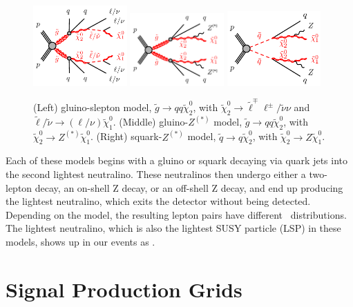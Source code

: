 \begin{figure}[htbp]
    \centering
    \includegraphics[width=0.32\textwidth]{Images/SUSY/gogo-qqqqllllN1N1-N2.pdf}
    \includegraphics[width=0.32\textwidth]{Images/SUSY/gogo-qqqqZZN1N1.pdf}
    \includegraphics[width=0.32\textwidth]{Images/SUSY/sqsq-qqZZN1N1.pdf}
    \caption{(Left) gluino-slepton model, $\tilde{g}\to qq \tilde{\chi}_2^0$, with $\tilde{\chi}_{2}^{0} \to \tilde{\ell}^{\mp}\ell^{\pm} / \tilde{\nu}\nu$ and $\tilde{\ell}/\tilde{\nu} \to (\ell/\nu)\tilde{\chi}_{1}^{0}$. (Middle) gluino-$Z^{(*)}$ model, $\tilde{g}\to qq \tilde{\chi}_2^0$, with $\tilde{\chi}_2^0\rightarrow Z^{(*)} \tilde{\chi}_1^0$. (Right) squark-$Z^{(*)}$ model, $\tilde{q}\to q \tilde{\chi}_2^0$, with $\tilde{\chi}_2^0\rightarrow Z \tilde{\chi}_1^0$.}
    \label{fig:SUSY_models}
\end{figure}

Each of these models begins with a gluino or squark decaying via quark jets into the second lightest neutralino. These neutralinos then undergo either a two-lepton decay, an on-shell Z decay, or an off-shell Z decay, and end up producing the lightest neutralino, which exits the detector without being detected. Depending on the model, the resulting lepton pairs have different \mll\ distributions. The lightest neutralino, which is also the lightest SUSY particle (LSP) in these models, shows up in our events as \MET.

\section{Signal Production Grids}

